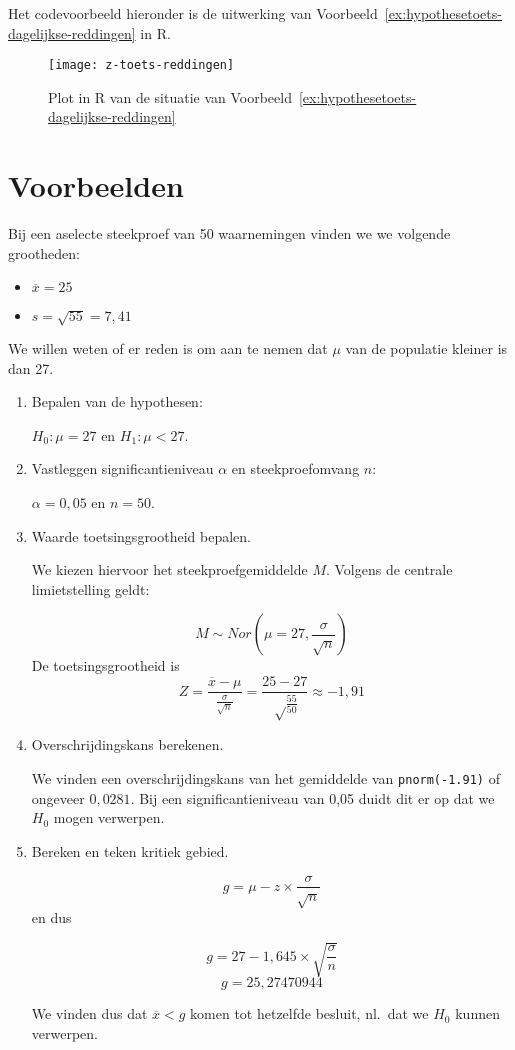 Het codevoorbeeld hieronder is de uitwerking van Voorbeeld~\ref{ex:hypothesetoets-dagelijkse-reddingen} in R.



\begin{figure}
  \centering
  \texttt{[image: z-toets-reddingen]}
  \caption{Plot in R van de situatie van Voorbeeld~\ref{ex:hypothesetoets-dagelijkse-reddingen}}
\end{figure}

\section{Voorbeelden}

\begin{example}
  Bij een aselecte steekproef van 50 waarnemingen vinden we we volgende grootheden:
  \begin{itemize}
    \item $\overline{x} = 25$
    \item $s = \sqrt{55} = 7,41$
  \end{itemize}
  
  We willen weten of er reden is om aan te nemen dat $\mu$ van de populatie kleiner is dan 27.
  
  \begin{enumerate}
    \item Bepalen van de hypothesen: 
    
    $H_{0} : \mu = 27$ en $H_{1}: \mu < 27$.
    
    \item Vastleggen significantieniveau $\alpha$ en steekproefomvang $n$:
    
    $\alpha = 0,05$ en $n=50$.
    
    \item Waarde toetsingsgrootheid bepalen. 
    
    We kiezen hiervoor het steekproefgemiddelde $M$. Volgens de centrale limietstelling geldt:
    
    \[ M \sim Nor(\mu = 27, \frac{\sigma}{\sqrt{n}}) \]
    De toetsingsgrootheid is
    \[ Z = \frac{\overline{x} - \mu}{\frac{\sigma}{\sqrt{n}}} = \frac{25-27}{\sqrt\frac{55}{50}} \approx -1,91\]
    
    \item Overschrijdingskans berekenen.
    
    We vinden een overschrijdingskans van het gemiddelde van \texttt{pnorm(-1.91)} of ongeveer $0,0281$. Bij een significantieniveau van 0,05 duidt dit er op dat we $H_{0}$ mogen verwerpen.
    
    \item Bereken en teken kritiek gebied.
    
    \[ g = \mu - z \times \frac{\sigma}{\sqrt{n}} \]
    en dus
    
    \[ g = 27 - 1,645 \times \sqrt{\frac{\sigma}{n}} \]
    \[ g =  25,27470944 \]
    
    We vinden dus dat $\overline{x} < g$ komen tot hetzelfde besluit, nl.~dat we $H_{0}$ kunnen verwerpen.
    
  \end{enumerate}
\end{example}

